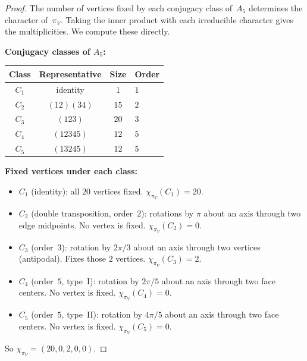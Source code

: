 \documentclass[11pt,a4paper]{article}
\theoremstyle{plain}
\theoremstyle{definition}
\begin{document}
\begin{proof}
The number of vertices fixed by each conjugacy class of~$A_5$
determines the character of~$\pi_V$.  Taking the inner product with
each irreducible character gives the multiplicities.  We compute these
directly.

\smallskip\noindent
\textbf{Conjugacy classes of $A_5$:}
\begin{center}
\begin{tabular}{@{}cccl@{}}
\toprule
Class & Representative & Size & Order \\
\midrule
$C_1$ & identity & $1$ & $1$ \\
$C_2$ & $(12)(34)$ & $15$ & $2$ \\
$C_3$ & $(123)$ & $20$ & $3$ \\
$C_4$ & $(12345)$ & $12$ & $5$ \\
$C_5$ & $(13245)$ & $12$ & $5$ \\
\bottomrule
\end{tabular}
\end{center}

\noindent
\textbf{Fixed vertices under each class:}
\begin{itemize}[nosep]
  \item $C_1$ (identity): all $20$ vertices fixed. $\chi_{\pi_V}(C_1) = 20$.
  \item $C_2$ (double transposition, order~$2$): rotations by $\pi$
    about an axis through two edge midpoints. No vertex is fixed.
    $\chi_{\pi_V}(C_2) = 0$.
  \item $C_3$ (order~$3$): rotation by $2\pi/3$ about an axis through
    two vertices (antipodal).  Fixes those $2$ vertices.
    $\chi_{\pi_V}(C_3) = 2$.
  \item $C_4$ (order~$5$, type~I): rotation by $2\pi/5$ about an axis
    through two face centers.  No vertex is fixed.
    $\chi_{\pi_V}(C_4) = 0$.
  \item $C_5$ (order~$5$, type~II): rotation by $4\pi/5$ about an axis
    through two face centers.  No vertex is fixed.
    $\chi_{\pi_V}(C_5) = 0$.
\end{itemize}

So $\chi_{\pi_V} = (20, 0, 2, 0, 0)$.


\end{proof}
\end{document}
